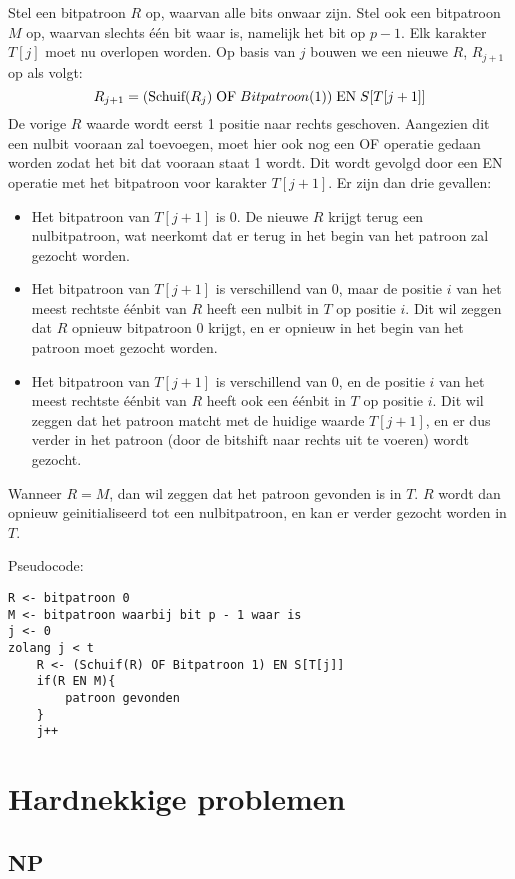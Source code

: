 \documentclass{report}
\begin{document}
\begin{enumerate}
	Stel een bitpatroon $R$ op, waarvan alle bits onwaar zijn. Stel ook een bitpatroon $M$ op, waarvan slechts één bit waar is, namelijk het bit op $p - 1$. Elk karakter $T[j]$ moet nu overlopen worden. Op basis van $j$ bouwen we een nieuwe $R$, $R_{j + 1}$ op  als volgt:
	$$R_{j + 1} = (\hbox{Schuif}(R_j)\;\hbox{OF}\;Bitpatroon(1))\;\hbox{EN}\;S[T[j + 1]]$$
	De vorige $R$ waarde wordt eerst 1 positie naar rechts geschoven. Aangezien dit een nulbit vooraan zal toevoegen, moet hier ook nog een OF operatie gedaan worden zodat het bit dat vooraan staat 1 wordt. Dit wordt gevolgd door een EN operatie met het bitpatroon voor karakter $T[j + 1]$. Er zijn dan drie gevallen:
	\begin{itemize}
		\item Het bitpatroon van $T[j + 1]$ is 0. De nieuwe $R$ krijgt terug een nulbitpatroon, wat neerkomt dat er terug in het begin van het patroon zal gezocht worden.
		\item Het bitpatroon van $T[j + 1]$ is verschillend van 0, maar de positie $i$ van het meest rechtste éénbit van $R$ heeft een nulbit in $T$ op positie $i$. Dit wil zeggen dat $R$ opnieuw bitpatroon 0 krijgt, en er opnieuw in het begin van het patroon moet gezocht worden.
		\item Het bitpatroon van $T[j + 1]$ is verschillend van 0, en de positie $i$ van het meest rechtste éénbit van $R$ heeft ook een éénbit in $T$ op positie $i$. Dit wil zeggen dat het patroon matcht met de huidige waarde $T[j + 1]$, en er dus verder in het patroon (door de bitshift naar rechts uit te voeren) wordt gezocht.
	\end{itemize}

	Wanneer $R = M$, dan wil zeggen dat het patroon gevonden is in $T$. $R$ wordt dan opnieuw geinitialiseerd tot een nulbitpatroon, en kan er verder gezocht worden in $T$.

	Pseudocode:
	\begin{lstlisting}
R <- bitpatroon 0
M <- bitpatroon waarbij bit p - 1 waar is
j <- 0
zolang j < t 
	R <- (Schuif(R) OF Bitpatroon 1) EN S[T[j]]
	if(R EN M){
		patroon gevonden
	} 
	j++
	\end{lstlisting}
\end{enumerate}

\part{Hardnekkige problemen}
\chapter{NP}
\end{document}
